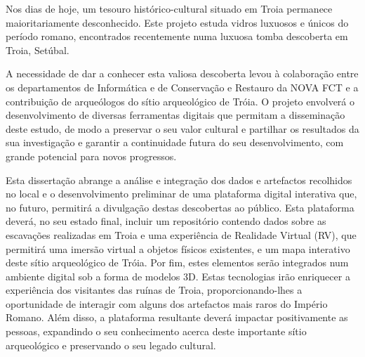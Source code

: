 
%

Nos dias de hoje, um tesouro histórico-cultural situado em Troia permanece maioritariamente desconhecido.  
Este projeto estuda vidros luxuosos e únicos do período romano, encontrados recentemente numa luxuosa tomba descoberta em Troia, Setúbal.


A necessidade de dar a conhecer esta valiosa descoberta levou à colaboração entre os departamentos de Informática e de Conservação e Restauro da NOVA FCT e a contribuição de arqueólogos do sítio arqueológico de Tróia. O projeto envolverá o desenvolvimento de diversas ferramentas digitais que permitam a disseminação deste estudo, de modo a preservar o seu valor cultural e partilhar os resultados da sua investigação
e garantir a continuidade futura do seu desenvolvimento, com grande potencial para novos progressos.

Esta dissertação abrange a análise e integração dos dados e artefactos recolhidos no local e o desenvolvimento preliminar de uma plataforma digital interativa que, no futuro, permitirá a divulgação destas descobertas ao público.
Esta plataforma deverá, no seu estado final, incluir um repositório contendo dados sobre as escavações realizadas em Troia e uma experiência de Realidade Virtual (RV), que permitirá uma imersão virtual a objetos físicos existentes, e um mapa interativo deste sítio arqueológico de Tróia. 
Por fim, estes elementos serão integrados num ambiente digital sob a forma de modelos 3D.
Estas tecnologias irão enriquecer a experiência dos visitantes das ruínas de Troia, proporcionando-lhes a oportunidade de interagir com alguns dos artefactos mais raros do Império Romano. 
Além disso, a plataforma resultante deverá impactar positivamente as pessoas, expandindo o seu conhecimento acerca deste importante sítio arqueológico e preservando o seu legado cultural.


